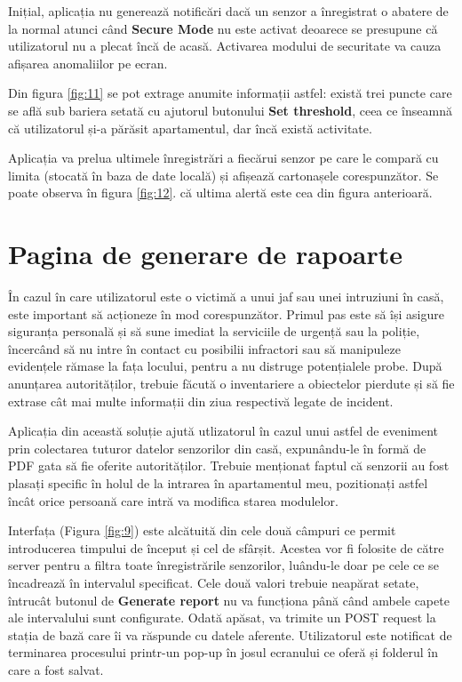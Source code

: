 Inițial, aplicația nu generează notificări dacă un senzor a înregistrat o abatere de la normal atunci când \textbf{Secure Mode} nu este activat deoarece se presupune că utilizatorul nu a plecat încă de acasă. Activarea modului de securitate va cauza afișarea anomaliilor pe ecran.

Din figura \ref{fig:11} se pot extrage anumite informații astfel: există trei puncte care se află sub bariera setată cu ajutorul butonului \textbf{Set threshold}, ceea ce înseamnă că utilizatorul și-a părăsit apartamentul, dar încă există activitate. 

Aplicația va prelua ultimele înregistrări a fiecărui senzor pe care le compară cu limita (stocată în baza de date locală) și afișează cartonașele corespunzător. Se poate observa în figura \ref{fig:12}. că ultima alertă este cea din figura anterioară.

\break

\section{Pagina de generare de rapoarte}
\label{section:report}

În cazul în care utilizatorul este o victimă a unui jaf sau unei intruziuni în casă, este important să acționeze în mod corespunzător. Primul pas este să își asigure siguranța personală și să sune imediat la serviciile de urgență sau la poliție, încercând să nu intre în contact cu posibilii infractori sau să manipuleze evidențele rămase la fața locului, pentru a nu distruge potențialele probe. După anunțarea autorităților, trebuie făcută o inventariere a obiectelor pierdute și să fie extrase cât mai multe informații din ziua respectivă legate de incident.

Aplicația din această soluție ajută utlizatorul în cazul unui astfel de eveniment prin colectarea tuturor datelor senzorilor din casă, expunându-le în formă de PDF gata să fie oferite autorităților. Trebuie menționat faptul că senzorii au fost plasați specific în holul de la intrarea în apartamentul meu, pozitionați astfel încât orice persoană care intră va modifica starea modulelor.

Interfața (Figura \ref{fig:9}) este alcătuită din cele două câmpuri ce permit introducerea timpului de început și cel de sfârșit. Acestea vor fi folosite de către server pentru a filtra toate înregistrările senzorilor, luându-le doar pe cele ce se încadrează în intervalul specificat. Cele două valori trebuie neapărat setate, întrucât butonul de \textbf{Generate report} nu va funcționa până când ambele capete ale intervalului sunt configurate. Odată apăsat, va trimite un POST request la stația de bază care îi va răspunde cu datele aferente. Utilizatorul este notificat de terminarea procesului printr-un pop-up în josul ecranului ce oferă și folderul în care a fost salvat.

